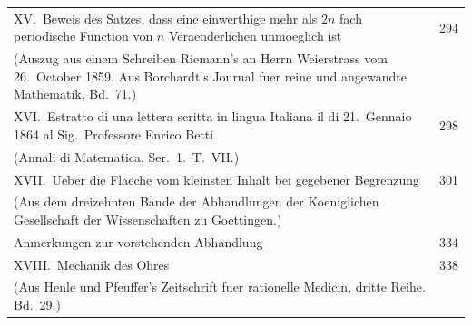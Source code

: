 \documentclass[12pt,a4paper]{book}
\theoremstyle{definition}
\theoremstyle{remark}
\begin{document}
\begin{longtable}{p{12cm}r}
XV.\ Beweis des Satzes, dass eine einwerthige mehr als $2n$ fach periodische Function von $n$ Veraenderlichen unmoeglich ist & 294\\
\quad (Auszug aus einem Schreiben Riemann's an Herrn Weierstrass vom 26.\ October 1859. Aus Borchardt's Journal fuer reine und angewandte Mathematik, Bd.\ 71.)\\[0.5em]

XVI.\ Estratto di una lettera scritta in lingua Italiana il di 21.\ Gennaio 1864 al Sig.\ Professore Enrico Betti & 298\\
\quad (Annali di Matematica, Ser.\ 1.\ T.\ VII.)\\[0.5em]

XVII.\ Ueber die Flaeche vom kleinsten Inhalt bei gegebener Begrenzung & 301\\
\quad (Aus dem dreizehnten Bande der Abhandlungen der Koeniglichen Gesellschaft der Wissenschaften zu Goettingen.)\\
\quad Anmerkungen zur vorstehenden Abhandlung & 334\\[0.5em]

XVIII.\ Mechanik des Ohres & 338\\
\quad (Aus Henle und Pfeuffer's Zeitschrift fuer rationelle Medicin, dritte Reihe. Bd.\ 29.)\\
\end{longtable}

\clearpage
\end{document}
